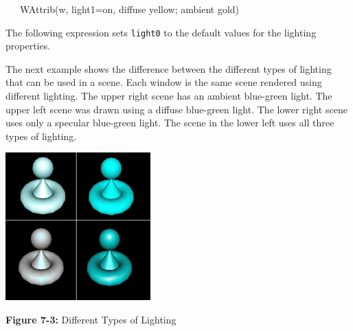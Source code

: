 \ \ \ WAttrib(w, {\textquotedbl}light1=on, diffuse yellow; ambient
gold{\textquotedbl})

The following expression sets \texttt{light0} to the default values for
the lighting properties.


The next example shows the difference between the different types of
lighting that can be used in a scene. Each window is the same scene
rendered using different lighting. The upper right scene has an ambient
blue-green light. The upper left scene was drawn using a diffuse
blue-green light. The lower right scene uses only a specular blue-green
light. The scene in the lower left uses all three types of lighting.

{\centering 
\includegraphics[width=2.1957in,height=2.2346in]{ub-img/ub-img33.jpg}
\par}

{\sffamily\bfseries Figure 7-3:}
{\sffamily Different Types of Lighting}

\bigskip

